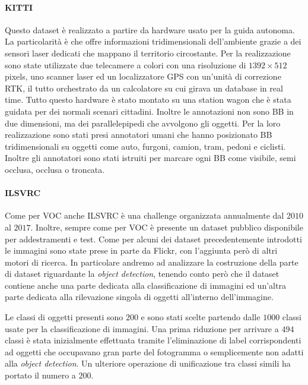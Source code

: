 \paragraph{KITTI}  \cite{geiger2012we} Questo dataset è realizzato a partire da hardware usato per la guida autonoma. La particolarità è che offre informazioni tridimensionali dell'ambiente grazie a dei sensori laser dedicati che mappano il territorio circostante. Per la realizzazione sono state  utilizzate due telecamere a colori con una risoluzione di $1392 \times 512$ pixels, uno scanner laser ed un localizzatore GPS con un'unità di correzione \ac{RTK}, il tutto orchestrato da un calcolatore su cui girava un database in real time.  Tutto questo hardware è stato montato su una station wagon che è stata guidata per dei normali scenari cittadini. 
Inoltre le annotazioni non sono \ac{BB} in due dimensioni, ma dei parallelepipedi che avvolgono gli oggetti. Per la loro realizzazione sono stati presi annotatori umani che hanno posizionato \ac{BB} tridimensionali su oggetti come auto, furgoni, camion, tram, pedoni e ciclisti. Inoltre gli annotatori sono stati istruiti per marcare ogni \ac{BB} come visibile, semi occlusa, occlusa o troncata. 



\paragraph{ILSVRC}
Come per \ac{VOC} anche \ac{ILSVRC} \cite{russakovsky2015imagenet} è una challenge organizzata annualmente dal $2010$ al $2017$. Inoltre, sempre come per \ac{VOC} è presente un dataset pubblico disponibile per addestramenti e test. 
Come per alcuni dei dataset precedentemente introdotti le immagini sono state prese in parte da Flickr, con l'aggiunta però di altri motori di ricerca. In particolare andremo ad analizzare la costruzione della parte di dataset riguardante la \textit{object detection}, tenendo conto però che il dataset contiene anche una parte dedicata alla classificazione di immagini ed un'altra parte dedicata alla rilevazione singola di oggetti all'interno dell'immagine. 

Le classi di oggetti presenti sono $200$ e sono stati scelte partendo dalle $1000$ classi usate per la classificazione di immagini. Una prima riduzione per arrivare a $494$ classi è stata inizialmente effettuata tramite l'eliminazione di label corrispondenti ad oggetti che occupavano gran parte del fotogramma o semplicemente non adatti alla \textit{object detection}. Un ulteriore operazione di unificazione tra classi simili ha portato il numero a $200$. 

